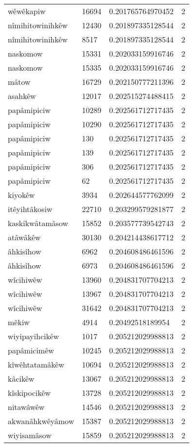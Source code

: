 \begin{longtable}{llll}
wêwêkapiw & 16694 & 0.201765764970452 & 2 \\
nîmihitowinihkêw & 12430 & 0.201897335128544 & 2 \\
nîmihitowinihkêw & 8517 & 0.201897335128544 & 2 \\
naskomow & 15331 & 0.202033159916746 & 2 \\
naskomow & 15335 & 0.202033159916746 & 2 \\
mâtow & 16729 & 0.202150777211396 & 2 \\
asahkêw & 12017 & 0.202515274488415 & 2 \\
papâmipiciw & 10289 & 0.202561712717435 & 2 \\
papâmipiciw & 10290 & 0.202561712717435 & 2 \\
papâmipiciw & 130 & 0.202561712717435 & 2 \\
papâmipiciw & 139 & 0.202561712717435 & 2 \\
papâmipiciw & 306 & 0.202561712717435 & 2 \\
papâmipiciw & 62 & 0.202561712717435 & 2 \\
kiyokêw & 3934 & 0.202644577762099 & 2 \\
itêyihtâkosiw & 22710 & 0.203299579281877 & 2 \\
kaskikwâtamâsow & 15852 & 0.203577739542743 & 2 \\
atâwâkêw & 30130 & 0.204214438617712 & 2 \\
âhkisîhow & 6962 & 0.204608486461596 & 2 \\
âhkisîhow & 6973 & 0.204608486461596 & 2 \\
wîcihiwêw & 13960 & 0.204831707704213 & 2 \\
wîcihiwêw & 13967 & 0.204831707704213 & 2 \\
wîcihiwêw & 31642 & 0.204831707704213 & 2 \\
mêkiw & 4914 & 0.20492518189954 & 2 \\
wiyipayihcikêw & 1017 & 0.205212029988813 & 2 \\
papâmicimêw & 10245 & 0.205212029988813 & 2 \\
kîwêhtatamâkêw & 10694 & 0.205212029988813 & 2 \\
kâcikêw & 13067 & 0.205212029988813 & 2 \\
kîskipocikêw & 13728 & 0.205212029988813 & 2 \\
nitawâwêw & 14546 & 0.205212029988813 & 2 \\
akwanâhkwêyâmow & 15387 & 0.205212029988813 & 2 \\
wiyisamâsow & 15859 & 0.205212029988813 & 2 \\

\end{longtable}
